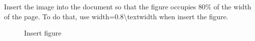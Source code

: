\documentclass{article}
\begin{document}
		Insert the image into the document so that the figure occupies 80\% of the width of the page. To do that, use width=0.8\textbackslash{textwidth} when insert the figure.
		\begin{figure}[tbh]
		\caption{Insert figure}
		\end{figure}
		
\end{document}
